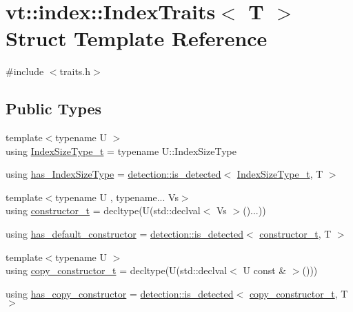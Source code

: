 \hypertarget{structvt_1_1index_1_1_index_traits}{}\section{vt\+:\+:index\+:\+:Index\+Traits$<$ T $>$ Struct Template Reference}
\label{structvt_1_1index_1_1_index_traits}


{\ttfamily \#include $<$traits.\+h$>$}

\subsection*{Public Types}
\begin{DoxyCompactItemize}
\item 
{\footnotesize template$<$typename U $>$ }\\using \hyperlink{structvt_1_1index_1_1_index_traits_a583a777d70fc52ccfe1083acabc9640f}{Index\+Size\+Type\+\_\+t} = typename U\+::\+Index\+Size\+Type
\item 
using \hyperlink{structvt_1_1index_1_1_index_traits_ad4433ee81a5b60b9d300efcec8b97181}{has\+\_\+\+Index\+Size\+Type} = \hyperlink{namespacedetection_a30893549a3de1e9603d78dad6d5dce92}{detection\+::is\+\_\+detected}$<$ \hyperlink{structvt_1_1index_1_1_index_traits_a583a777d70fc52ccfe1083acabc9640f}{Index\+Size\+Type\+\_\+t}, T $>$
\item 
{\footnotesize template$<$typename U , typename... Vs$>$ }\\using \hyperlink{structvt_1_1index_1_1_index_traits_a752bed91b021dff94a5b2863442e07c9}{constructor\+\_\+t} = decltype(U(std\+::declval$<$ Vs $>$()...))
\item 
using \hyperlink{structvt_1_1index_1_1_index_traits_a583c6d370e78ca2c8b9fc67bd2d1d942}{has\+\_\+default\+\_\+constructor} = \hyperlink{namespacedetection_a30893549a3de1e9603d78dad6d5dce92}{detection\+::is\+\_\+detected}$<$ \hyperlink{structvt_1_1index_1_1_index_traits_a752bed91b021dff94a5b2863442e07c9}{constructor\+\_\+t}, T $>$
\item 
{\footnotesize template$<$typename U $>$ }\\using \hyperlink{structvt_1_1index_1_1_index_traits_ad99299628a662db3cfa5021b810e8846}{copy\+\_\+constructor\+\_\+t} = decltype(U(std\+::declval$<$ U const  \& $>$()))
\item 
using \hyperlink{structvt_1_1index_1_1_index_traits_a7440b1a34592c08fcd93fd9a39ffbfa7}{has\+\_\+copy\+\_\+constructor} = \hyperlink{namespacedetection_a30893549a3de1e9603d78dad6d5dce92}{detection\+::is\+\_\+detected}$<$ \hyperlink{structvt_1_1index_1_1_index_traits_ad99299628a662db3cfa5021b810e8846}{copy\+\_\+constructor\+\_\+t}, T $>$

\end{DoxyCompactItemize}
